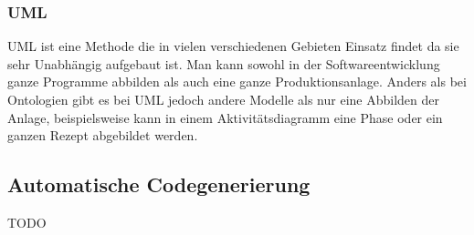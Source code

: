 \subsubsection{UML}
UML ist eine Methode die in vielen verschiedenen Gebieten Einsatz findet da sie sehr Unabhängig aufgebaut ist. Man kann sowohl in der Softwareentwicklung ganze Programme abbilden als auch eine ganze Produktionsanlage. Anders als bei Ontologien gibt es bei UML jedoch andere Modelle als nur eine Abbilden der Anlage, beispielsweise kann in einem Aktivitätsdiagramm eine Phase oder ein ganzen Rezept abgebildet werden.
\subsection{Automatische Codegenerierung}

TODO

